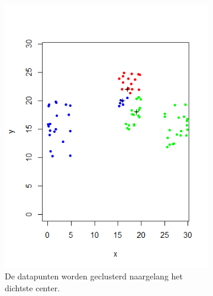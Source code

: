 \documentclass[a4paper,12pt]{article}
\theoremstyle{definition}
\begin{document}
\begin{figure}[!ht]
\begin{subfigure}[t]{0.3\textwidth}
        \includegraphics[width=\textwidth]{kmeans_it0.png}
        \caption{De datapunten worden geclusterd naargelang het dichtste center.}
    \end{subfigure}
    \begin{subfigure}[t]{0.3\textwidth}

\end{subfigure}
\end{figure}
\end{document}
